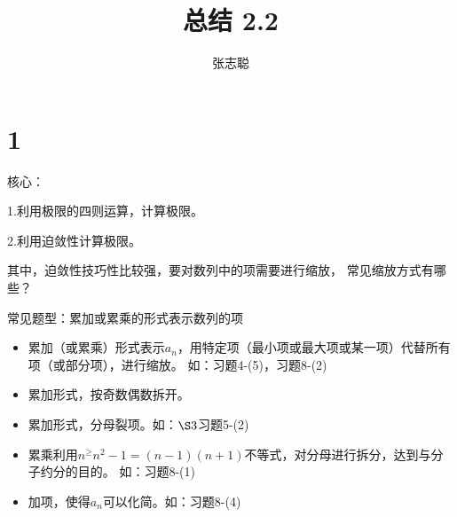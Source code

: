 \documentclass{article}
\begin{document}
\title{总结 2.2}
\author{张志聪}
\maketitle

\section*{1}

\begin{zremark}
  核心：

  1.利用极限的四则运算，计算极限。

  2.利用迫敛性计算极限。

  其中，迫敛性技巧性比较强，要对数列中的项需要进行缩放，
  常见缩放方式有哪些？
\end{zremark}

常见题型：累加或累乘的形式表示数列的项
\begin{itemize}
  \item 累加（或累乘）形式表示$a_n$，用特定项（最小项或最大项或某一项）代替所有项（或部分项），进行缩放。
        如：习题4-(5)，习题8-(2)
  \item 累加形式，按奇数偶数拆开。
  \item 累加形式，分母裂项。如：$\S 3$习题5-(2)
  \item 累乘利用$n^ \geq n^2 - 1 = (n - 1)(n + 1)$不等式，对分母进行拆分，达到与分子约分的目的。
        如：习题8-(1)
  \item 加项，使得$a_n$可以化简。如：习题8-(4)
\end{itemize}
\end{document}
